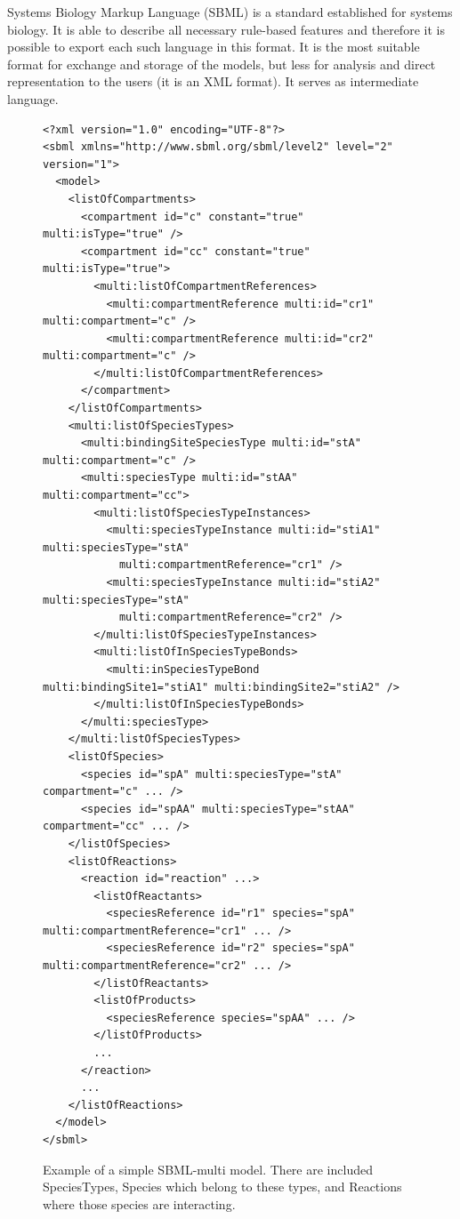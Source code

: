 \documentclass[12pt]{fithesis2}
\begin{document}
Systems Biology Markup Language (SBML) is a standard established for systems biology. It is able to describe all necessary rule-based features and therefore it is possible to export each such language in this format. It is the most suitable format for exchange and storage of the models, but less for analysis and direct representation to the users (it is an XML format). It serves as intermediate language.

\begin{figure}[!h]
\lstset{language=XML}
\begin{lstlisting}[basicstyle=\tiny, frame=single]
<?xml version="1.0" encoding="UTF-8"?>
<sbml xmlns="http://www.sbml.org/sbml/level2" level="2" version="1">
  <model>
    <listOfCompartments>
      <compartment id="c" constant="true" multi:isType="true" />
      <compartment id="cc" constant="true" multi:isType="true">
        <multi:listOfCompartmentReferences>
          <multi:compartmentReference multi:id="cr1" multi:compartment="c" />
          <multi:compartmentReference multi:id="cr2" multi:compartment="c" />
        </multi:listOfCompartmentReferences>
      </compartment>
    </listOfCompartments>
    <multi:listOfSpeciesTypes>
      <multi:bindingSiteSpeciesType multi:id="stA" multi:compartment="c" />
      <multi:speciesType multi:id="stAA" multi:compartment="cc">
        <multi:listOfSpeciesTypeInstances>
          <multi:speciesTypeInstance multi:id="stiA1" multi:speciesType="stA"
            multi:compartmentReference="cr1" />
          <multi:speciesTypeInstance multi:id="stiA2" multi:speciesType="stA"
            multi:compartmentReference="cr2" />
        </multi:listOfSpeciesTypeInstances>
        <multi:listOfInSpeciesTypeBonds>
          <multi:inSpeciesTypeBond multi:bindingSite1="stiA1" multi:bindingSite2="stiA2" />
        </multi:listOfInSpeciesTypeBonds>
      </multi:speciesType>
    </multi:listOfSpeciesTypes>
    <listOfSpecies>
      <species id="spA" multi:speciesType="stA" compartment="c" ... />
      <species id="spAA" multi:speciesType="stAA" compartment="cc" ... />
    </listOfSpecies>
    <listOfReactions>
      <reaction id="reaction" ...>
        <listOfReactants>
          <speciesReference id="r1" species="spA" multi:compartmentReference="cr1" ... />
          <speciesReference id="r2" species="spA" multi:compartmentReference="cr2" ... />
        </listOfReactants>
        <listOfProducts>
          <speciesReference species="spAA" ... />
        </listOfProducts>
        ...
      </reaction>
      ...
    </listOfReactions>
  </model>
</sbml>
\end{lstlisting}
\caption{Example of a simple SBML-multi model. There are included SpeciesTypes, Species which belong to these types, and Reactions where those species are interacting.}\label{SBML_example}
\end{figure}
\end{document}
